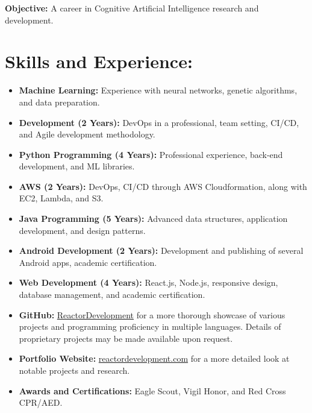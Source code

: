 \documentclass[11pt]{article}
\title{}
\author{\textbf{Matthew Thomas Pisano}\\212 DeWitt Mills Road, Hurley, New York\\
    \href{mailto:matthewpisano14@gmail.com}{matthewpisano14@gmail.com}\\(845)-706-0677}
\date{}
\begin{document}
    \pagestyle{plain} 
    \maketitle
    \vspace{-0.4in}
    \hspace*{-0.3in}
    \textbf{Objective:} A career in Cognitive Artificial Intelligence research and development. 

    \section*{Skills and Experience:}
    \begin{itemize}
        \itemsep0em 
        \item \textbf{Machine Learning:} Experience with neural networks, genetic algorithms, and data preparation.
        \item \textbf{Development (2 Years):} DevOps in a professional, team setting, CI/CD, and Agile development methodology. 
        \item \textbf{Python Programming (4 Years):} Professional experience, back-end development, and ML libraries.
        \item \textbf{AWS (2 Years):} DevOps, CI/CD through AWS Cloudformation, along with EC2, Lambda, and S3.
        \item \textbf{Java Programming (5 Years):} Advanced data structures, application development, and design patterns.
        \item \textbf{Android Development (2 Years):} Development and publishing of several Android apps, academic certification.
        \item \textbf{Web Development (4 Years):} React.js, Node.js, responsive design, 
            database management, and academic certification.
        \item \textbf{GitHub:} \href{https://github.com/ReactorDevelopment}{ReactorDevelopment} for a more thorough 
            showcase of various projects and programming proficiency in multiple languages.  
            Details of proprietary projects may be made available upon request.
        \item \textbf{Portfolio Website:} \href{https://reactordevelopment.com}{reactordevelopment.com} for a 
            more detailed look at notable projects and research.
        \item \textbf{Awards and Certifications:} Eagle Scout, Vigil Honor, and Red Cross CPR/AED.
    \end{itemize}
\end{document}
